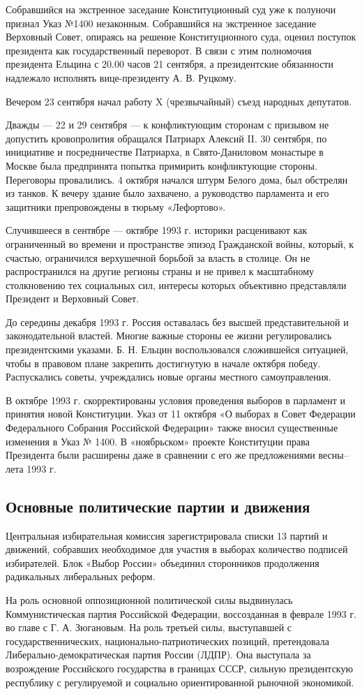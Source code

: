 Собравшийся на экстренное заседание Конституционный суд уже к полуночи признал Указ №1400 незаконным. Собравшийся на экстренное заседание Верховный Совет, опираясь на решение Конституционного суда, оценил поступок президента как государственный переворот. В связи с этим полномочия президента Ельцина с 20.00 часов 21 сентября, а президентские обязанности надлежало исполнять вице-президенту А. В. Руцкому.

Вечером 23 сентября начал работу X (чрезвычайный) съезд народных депутатов.

Дважды — 22 и 29 сентября — к конфликтующим сторонам с призывом не допустить кровопролития обращался Патриарх Алексий II. 30 сентября, по инициативе и посредничестве Патриарха, в Свято-Даниловом монастыре в Москве была предпринята попытка примирить конфликтующие стороны. Переговоры провалились. 4 октября начался штурм Белого дома, был обстрелян из танков. К вечеру здание было захвачено, а руководство парламента и его защитники препровождены в тюрьму «Лефортово».

Случившееся в сентябре — октябре 1993 г. историки расценивают как ограниченный во времени и пространстве эпизод Гражданской войны, который, к счастью, ограничился верхушечной борьбой за власть в столице. Он не распространился на другие регионы страны и не привел к масштабному столкновению тех социальных сил, интересы которых объективно представляли Президент и Верховный Совет.

До середины декабря 1993 г. Россия оставалась без высшей представительной и законодательной властей. Многие важные стороны ее жизни регулировались президентскими указами. Б. Н. Ельцин воспользовался сложившейся ситуацией, чтобы в правовом плане закрепить достигнутую в начале октября победу. Распускались советы, учреждались новые органы местного самоуправления.

В октябре 1993 г. скорректированы условия проведения выборов в парламент и принятия новой Конституции. Указ от 11 октября «О выборах в Совет Федерации Федерального Собрания Российской Федерации» также вносил существенные изменения в Указ № 1400. В «ноябрьском» проекте Конституции права Президента были расширены даже в сравнении с его же предложениями весны–лета 1993 г.
\subsection{Основные политические партии и движения}
Центральная избирательная комиссия зарегистрировала списки 13 партий и движений, собравших необходимое для участия в выборах количество подписей избирателей. Блок «Выбор России» объединил сторонников продолжения радикальных либеральных реформ.

На роль основной оппозиционной политической силы выдвинулась Коммунистическая партия Российской Федерации, воссозданная в феврале 1993 г. во главе с Г. А. Зюгановым. На роль третьей силы, выступавшей с государственнических, национально-патриотических позиций, претендовала Либерально-демократическая партия России (ЛДПР). Она выступала за возрождение Российского государства в границах СССР, сильную президентскую республику с регулируемой и социально ориентированной рыночной экономикой.
